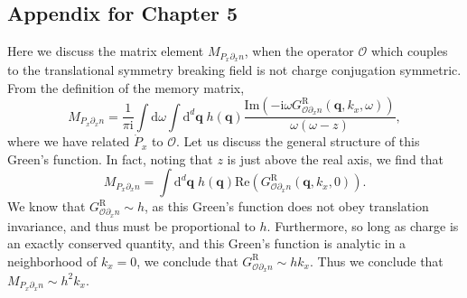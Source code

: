 \documentclass[10pt, oneside]{book}
\begin{document}
\begin{doublespace}
\begin{appendix}
\chapter{Appendix for Chapter 5} \label{appb}
Here we discuss the matrix element $M_{P_x\partial_x n}$, when the operator $\mathcal{O}$ which couples to the translational symmetry breaking field is not charge conjugation symmetric.   From the definition of the memory matrix, \begin{equation}
M_{P_x\partial_x n} = \frac{1}{\pi\mathrm{i}}\int \mathrm{d}\omega \int \mathrm{d}^d\mathbf{q} \; h(\mathbf{q}) \frac{\mathrm{Im}\left(-\mathrm{i}\omega G^{\mathrm{R}}_{\mathcal{O}\partial_x n}(\mathbf{q},k_x,\omega)\right)}{\omega(\omega - z)},
\end{equation}where we have related $\dot{P}_x$ to $\mathcal{O}$.   Let us discuss the general structure of this Green's function.   In fact, noting that $z$ is just above the real axis, we find that \begin{equation}
M_{P_x\partial_x n} = \int \mathrm{d}^d\mathbf{q} \; h(\mathbf{q}) \mathrm{Re}\left(G^{\mathrm{R}}_{\mathcal{O}\partial_xn}(\mathbf{q},k_x,0)\right).
\end{equation} We know that $G^{\mathrm{R}}_{\mathcal{O}\partial_x n} \sim h$, as this Green's function does not obey translation invariance, and thus must be proportional to $h$.   Furthermore, so long as charge is an exactly conserved quantity, and this Green's function is analytic in a neighborhood of $k_x=0$, we conclude that $G^{\mathrm{R}}_{\mathcal{O}\partial_x n} \sim hk_x$.    Thus we conclude that $M_{P_x\partial_x n} \sim h^2k_x$.


\end{appendix}
\end{doublespace}
\end{document}
